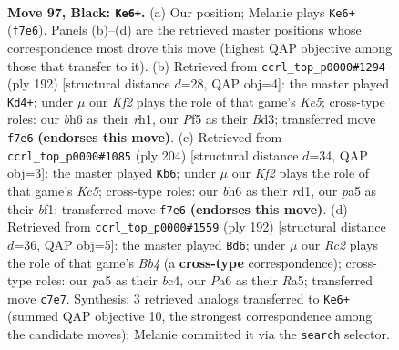 \documentclass[11pt]{article}
\begin{document}
\clearpage

\begin{figure}[p]\centering
\begin{subfigure}{0.46\textwidth}\centering
\resizebox{\linewidth}{!}{%
\newchessgame
\chessboard[
  setfen={2n5/2r2k1K/p6B/P4p1p/8/N5Pb/8/R7 b - - 5 97},
  showmover=false,
  pgfstyle=straightmove, color=movearrow, markmove={f7-e6}
]}
\caption{}
\end{subfigure}\hfill
\begin{subfigure}{0.46\textwidth}\centering
\resizebox{\linewidth}{!}{%
\newchessgame
\chessboard[
  setfen={4b3/4k1p1/8/4K3/1p5P/3B4/1P2R3/7r w - - 7 97},
  showmover=false,
  pgfstyle=straightmove, color=movearrow, markmove={e5-d4}
]}
\caption{}
\end{subfigure}
\\[4pt]
\begin{subfigure}{0.46\textwidth}\centering
\resizebox{\linewidth}{!}{%
\newchessgame
\chessboard[
  setfen={8/1B4k1/p5p1/P1K1R1P1/8/8/8/3r1b2 w - - 60 103},
  showmover=false,
  pgfstyle=straightmove, color=movearrow, markmove={c5-b6}
]}
\caption{}
\end{subfigure}\hfill
\begin{subfigure}{0.46\textwidth}\centering
\resizebox{\linewidth}{!}{%
\newchessgame
\chessboard[
  setfen={8/4K3/2k5/R4P1p/1Bb4P/3n3P/8/8 w - - 3 97},
  showmover=false,
  pgfstyle=straightmove, color=movearrow, markmove={b4-d6}
]}
\caption{}
\end{subfigure}
\caption{\textbf{Move 97, Black: \texttt{Ke6+}.} (a) Our position; Melanie plays \texttt{Ke6+} (\texttt{f7e6}). Panels (b)--(d) are the retrieved master positions whose correspondence most drove this move (highest QAP objective among those that transfer to it). (b) Retrieved from \texttt{ccrl\_top\_p0000\#1294} (ply 192) [structural distance $d$=28, QAP obj=4]: the master played \texttt{Kd4+}; under $\mu$ our \emph{Kf2} plays the role of that game's \emph{Ke5}; cross-type roles: our \emph{b}h6 as their \emph{r}h1, our \emph{P}f5 as their \emph{B}d3; transferred move \texttt{f7e6} \textbf{(endorses this move)}. (c) Retrieved from \texttt{ccrl\_top\_p0000\#1085} (ply 204) [structural distance $d$=34, QAP obj=3]: the master played \texttt{Kb6}; under $\mu$ our \emph{Kf2} plays the role of that game's \emph{Kc5}; cross-type roles: our \emph{b}h6 as their \emph{r}d1, our \emph{p}a5 as their \emph{b}f1; transferred move \texttt{f7e6} \textbf{(endorses this move)}. (d) Retrieved from \texttt{ccrl\_top\_p0000\#1559} (ply 192) [structural distance $d$=36, QAP obj=5]: the master played \texttt{Bd6}; under $\mu$ our \emph{Rc2} plays the role of that game's \emph{Bb4} (a \textbf{cross-type} correspondence); cross-type roles: our \emph{p}a5 as their \emph{b}c4, our \emph{P}a6 as their \emph{R}a5; transferred move \texttt{c7e7}. Synthesis: 3 retrieved analogs transferred to \texttt{Ke6+} (summed QAP objective 10, the strongest correspondence among the candidate moves); Melanie committed it via the \texttt{search} selector.}
\label{fig:thought-m193}
\end{figure}
\end{document}
